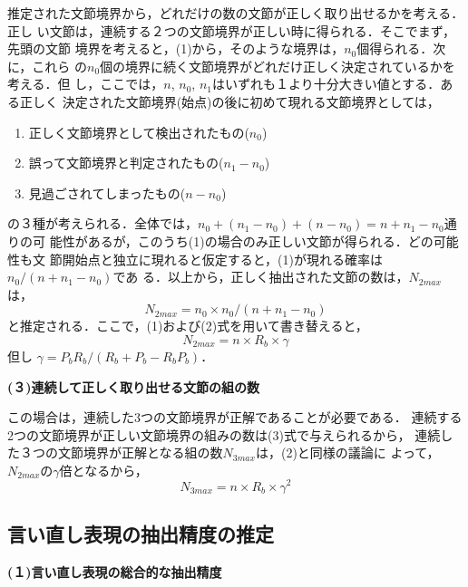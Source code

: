 推定された文節境界から，どれだけの数の文節が正しく取り出せるかを考える．正し
い文節は，連続する２つの文節境界が正しい時に得られる．そこでまず，先頭の文節
境界を考えると，(1)から，そのような境界は，$n_0$個得られる．次に，これら
の$n_0$個の境界に続く文節境界がどれだけ正しく決定されているかを考える．但
し，ここでは，$n$, $n_0$, $n_1$はいずれも１より十分大きい値とする．ある正しく
決定された文節境界(始点)の後に初めて現れる文節境界としては，
\Vspace
\begin{enumerate}
\item  正しく文節境界として検出されたもの($n_0$)
\item  誤って文節境界と判定されたもの($n_1 - n_0$)
\item  見過ごされてしまったもの($n - n_0$)
\end{enumerate}
\Vspace
の３種が考えられる．全体では，$n_0+(n_1-n_0)+(n-n_0)=n+n_1-n_0$通りの可
能性があるが，このうち(1)の場合のみ正しい文節が得られる．どの可能性も文
節開始点と独立に現れると仮定すると，(1)が現れる確率は$n_0/(n+n_1-n_0)$であ
る．以上から，正しく抽出された文節の数は，$N_{2max}$は，
\begin{equation}
 N_{2max} = n_0 \times n_0 / (n+n_1-n_0)
\end{equation}
と推定される．ここで，(1)および(2)式を用いて書き替えると，
\begin{equation}
  N_{2max} = n \times R_b \times \gamma
\end{equation}
但し $\gamma= P_bR_b  / (R_b+P_b-R_bP_b)$．

\begin{flushleft}
  \bf (３)連続して正しく取り出せる文節の組の数
\end{flushleft}

この場合は，連続した3つの文節境界が正解であることが必要である．
連続する2つの文節境界が正しい文節境界の組みの数は(3)式で与えられるから，
連続した３つの文節境界が正解となる組の数$N_{3max}$は，(2)と同様の議論に
よって，$N_{2max}$の$ \gamma$倍となるから，
\begin{equation}
　N_{3max} = n \times R_b \times \gamma^2
\end{equation}
\subsection{言い直し表現の抽出精度の推定}
\begin{flushleft}
  \bf (１)言い直し表現の総合的な抽出精度
\end{flushleft}

